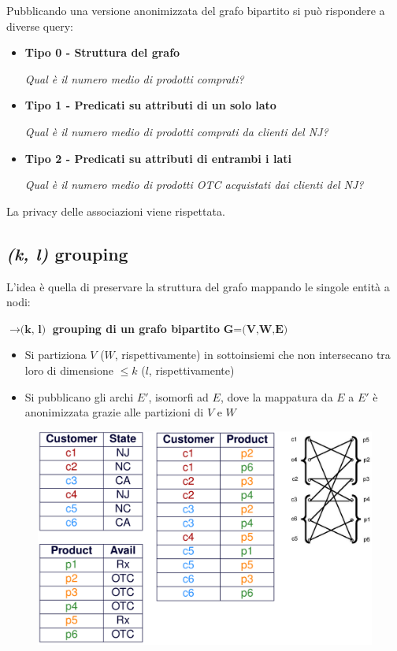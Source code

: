 \documentclass{report}
\begin{document}
\noindent Pubblicando una versione anonimizzata del grafo bipartito 
si può rispondere a diverse query:
\begin{itemize}
    \item \textbf{Tipo 0 - Struttura del grafo}
    
    \textit{Qual è il numero medio di prodotti comprati?}
    \item \textbf{Tipo 1 - Predicati su attributi di un solo lato}
    
    \textit{Qual è il numero medio di prodotti comprati da clienti del NJ?}
    \item \textbf{Tipo 2 - Predicati su attributi di entrambi i lati}
    
    \textit{Qual è il numero medio di prodotti OTC acquistati dai clienti del NJ?}
\end{itemize}

\noindent La privacy delle associazioni viene rispettata.

\subsection{\textit{(k, l)} grouping}
L'idea è quella di preservare la struttura del grafo mappando 
le singole entità a nodi:

$\rightarrow \textbf{(k, l)}$ \textbf{grouping di un grafo bipartito} $\textbf{G=(V,W,E)}$
\begin{itemize}
    \item Si partiziona $V$ ($W$, rispettivamente) in sottoinsiemi che non intersecano tra loro di 
    dimensione $\leq k$ ($l$, rispettivamente)
    \item Si pubblicano gli archi $E'$, isomorfi ad $E$, dove la mappatura da $E$ a $E'$ è 
    anonimizzata grazie alle partizioni di $V$ e $W$
\end{itemize} 

\begin{figure}[ht]
    \centering
    \includegraphics[width=0.79\linewidth]{images/publ-obf-ass/k-l1.png}
\end{figure}
\end{document}

